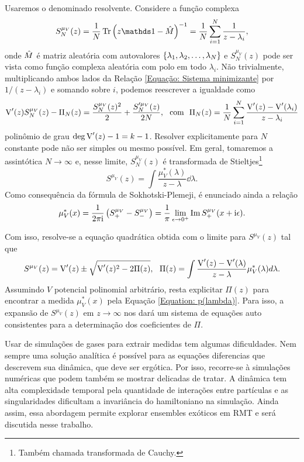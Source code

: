 \documentclass[12pt]{report}
\begin{document}
Usaremos o denominado resolvente. Considere a função complexa $$S^{\mu_V}_N(z) = \frac{1}{N} \Tr{\left(z\Id - \matriz{M}\right)^{-1}} = \frac{1}{N} \sum_{i=1}^{N} \frac{1}{z - \lambda_i},$$ onde $\hat M$ é matriz aleatória com autovalores $\{\lambda_1, \lambda_2, \dots, \lambda_N\}$ e $S^{\mu_V}_N(z)$ pode ser vista como função complexa aleatória com polo em todo $\lambda_i$. Não trivialmente, multiplicando ambos lados da Relação \eqref{Equação: Sistema minimizante} por $1/(z-\lambda_i)$ e somando sobre $i$, podemos reescrever a igualdade como $$\operatorname{V}'(z) S^{\mu_V}_N(z) - \Pi_N(z) = \frac{S^{\mu_V}_N (z)^2}{2} + \frac{S'^{\mu_V}_N(z)}{2N}, \ \ \text{com}\ \  \Pi_N(z) = \frac{1}{N} \sum_{i = 1}^{N} \frac{\operatorname{V}'(z) - \operatorname{V}'(\lambda_i)}{z - \lambda_i}$$ polinômio de grau $\deg{\operatorname{V}'(z)} - 1 = k - 1$. Resolver explicitamente para $N$ constante pode não ser simples ou mesmo possível. Em geral, tomaremos a assintótica $N \to \infty$ e, nesse limite, $S^{\mu_V}_N(z)$ é transformada de Stieltjes\footnote{Também chamada transformada de Cauchy.} $$S^{\mu_V}(z) = \int \frac{\mu^*_V(\lambda)}{z - \lambda} \dd \lambda.$$ Como consequência da fórmula de Sokhotski-Plemeji, é enunciado ainda a relação 
\begin{equation}
	\mu^{*}_{V}(x) = \frac{1}{2\pi \mathrm{i}} \left( S^{\mu_V}_{+} -  S^{\mu_V}_{-}\right) = \frac{1}{\pi} \lim_{\epsilon \to 0^+} \operatorname{Im}{S^{\mu_V}_{+}(x + \mathrm{i}\epsilon)}.
	\label{Equation: p(lambda)}
\end{equation} 

Com isso, resolve-se a equação quadrática obtida com o limite para $S^{\mu_V}(z)$ tal que
\begin{equation}
	S^{\mu_V}(z) = \operatorname{V}'(z) \pm \sqrt{\operatorname{V}'(z)^2 - 2 \Pi(z) }, \ \ \Pi(z) = \int \frac{\operatorname{V}'(z) - \operatorname{V}'(\lambda)}{z - \lambda} \mu^*_V(\lambda) d\lambda.
	\label{Equation: Resolvent}
\end{equation}
Assumindo $V$ potencial polinomial arbitrário, resta explicitar $\Pi(z)$ para encontrar a medida $\mu^{*}_{V}(x)$ pela Equação \eqref{Equation: p(lambda)}. Para isso, a expansão de $S^{\mu_V}(z)$ em $z \rightarrow \infty$ nos dará um sistema de equações auto consistentes para a determinação dos coeficientes de $\Pi$.

Usar de simulações de gases para extrair medidas tem algumas dificuldades. Nem sempre uma solução analítica é possível para as equações diferencias que descrevem sua dinâmica, que deve ser ergótica. Por isso, recorre-se à simulações numéricas que podem também se mostrar delicadas de tratar. A dinâmica tem alta complexidade temporal pela quantidade de interações entre partículas e as singularidades dificultam a invariância do hamiltoniano na simulação. Ainda assim, essa abordagem permite explorar ensembles exóticos em RMT e será discutida nesse trabalho.
\end{document}
